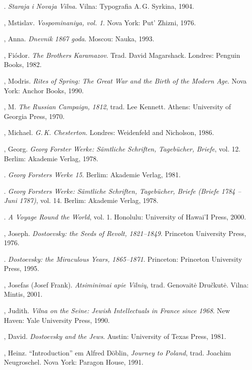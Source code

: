 \begin{bibliohedra}
  \titidem. \textit{Staraja i Novaja Vilna}. Vilna: Typografia A.\,G.
  Syrkina, 1904.

  , Mstislav. \textit{Vospominaniya, vol. 1}. Nova York: Put'
  Zhizni, 1976.

  , Anna. \textit{Dnevnik 1867 goda}.
  Moscou: Nauka, 1993.

  , Fiódor. \textit{The Brothers Karamazov}. Trad. David
  Magarshack. Londres: Penguin Books, 1982.

  , Modris. \textit{Rites of Spring: The Great War and the Birth
  of the Modern Age}. Nova York: Anchor Books, 1990.

  , M. \textit{The Russian Campaign, 1812}, trad. Lee Kennett.
  Athens: University of Georgia Press, 1970.

  , Michael. \textit{G.\,K. Chesterton}. Londres: Weidenfeld and
  Nicholson, 1986.

  , Georg. \textit{Georg Forster Werke: Sämtliche Schriften,
  Tagebücher, Briefe}, vol. 12. Berlim: Akademie
  Verlag, 1978.

  \titidem. \textit{Georg Forsters Werke 15}.
  Berlim: Akademie Verlag, 1981.

  \titidem. \textit{Georg Forsters Werke: Sämtliche Schriften,
  Tagebücher, Briefe (Briefe 1784 -- Juni 1787)}, vol. 14. Berlim: Akademie Verlag, 1978.

  \titidem. \textit{A Voyage Round the World}, vol. 1. Honolulu:
  University of Hawai'I Press, 2000.

  , Joseph. \textit{Dostoevsky: the Seeds of Revolt, 1821--1849}.
  Princeton University Press, 1976.

  \titidem. \textit{Dostoevsky: the Miraculous Years, 1865--1871}.
  Princeton: Princeton University Press, 1995.

  , Josefas (Josef Frank). \textit{Atsiminimai apie Vilnių}, trad.
  Genovaitė Dručkutė. Vilna: Mintis, 2001.

  , Judith. \textit{Vilna on the Seine: Jewish Intellectuals in
  France since 1968}. New Haven: Yale University Press, 1990.

  , David. \textit{Dostoevsky and the Jews}. Austin: University
  of Texas Press, 1981.

  , Heinz. ``Introduction'' em Alfred Döblin, \textit{Journey to
  Poland}, trad. Joachim Neugroschel. Nova York: Paragon House, 1991.


\end{bibliohedra}
